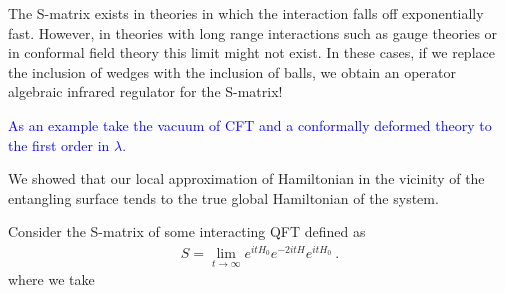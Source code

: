 \documentclass[a4paper,11pt]{article}
\theoremstyle{definition}
\newcommand{\NL}[1]{\textcolor{blue}{#1}}
\begin{document}
The S-matrix exists in theories in which the interaction falls off exponentially fast. However, in theories with long range interactions such as gauge theories or in conformal field theory this limit might not exist. In these cases, if we replace the inclusion of wedges with the inclusion of balls, we obtain an operator algebraic infrared regulator for the S-matrix!

\NL{As an example take the vacuum of CFT and a conformally deformed theory to the first order in $\lambda$.}





We showed that our local approximation of Hamiltonian in the vicinity of the entangling surface tends to the true global Hamiltonian of the system. 

Consider the S-matrix of some interacting QFT defined as
\begin{eqnarray}
S=\lim_{t\to \infty} e^{i t H_0}e^{-2i t H}e^{it H_0}\ .
\end{eqnarray}
where we take




\end{document}

